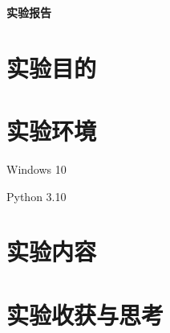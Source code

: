 \documentclass[UTF8]{ctexart}
\begin{document}
\begin{center}
    \Huge\textbf{实验报告}
\end{center}


\section{实验目的}

\section{实验环境}
Windows 10
\par
Python 3.10


\section{实验内容}




\clearpage
\section{实验收获与思考}

\end{document}
